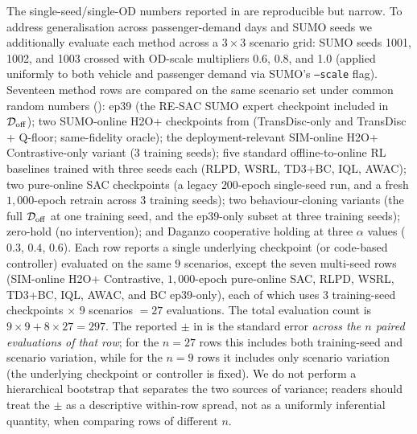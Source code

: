 The single-seed/single-OD numbers reported in  are reproducible but narrow.
To address generalisation across passenger-demand days and SUMO seeds we additionally
evaluate each method across a $3 \times 3$ scenario grid: SUMO seeds
1001, 1002, and 1003 crossed with OD-scale multipliers 0.6, 0.8, and 1.0
(applied uniformly to both vehicle and passenger demand via SUMO's
\texttt{--scale} flag).
Seventeen method rows are compared on the same scenario set under common random numbers ():
ep39 (the RE-SAC SUMO expert checkpoint included in $\mathcal{D}_{\mathrm{off}}$);
two SUMO-online H2O+ checkpoints from  (TransDisc-only and TransDisc + Q-floor; same-fidelity oracle);
the deployment-relevant SIM-online H2O+ Contrastive-only variant ($3$ training seeds);
five standard offline-to-online RL baselines trained with three seeds each (RLPD, WSRL, TD3+BC, IQL, AWAC);
two pure-online SAC checkpoints (a legacy $200$-epoch single-seed run, and a fresh $1{,}000$-epoch retrain across $3$ training seeds);
two behaviour-cloning variants (the full $\mathcal{D}_{\mathrm{off}}$ at one training seed, and the ep39-only subset at three training seeds);
zero-hold (no intervention);
and Daganzo cooperative holding at three $\alpha$ values ($0.3$, $0.4$, $0.6$).
Each row reports a single underlying checkpoint (or code-based controller) evaluated on the same $9$ scenarios, except the seven multi-seed rows (SIM-online H2O+ Contrastive, $1{,}000$-epoch pure-online SAC, RLPD, WSRL, TD3+BC, IQL, AWAC, and BC ep39-only), each of which uses $3$ training-seed checkpoints $\times$ $9$ scenarios $= 27$ evaluations.
The total evaluation count is $9 \times 9 + 8 \times 27 = 297$.
The reported $\pm$ in  is the standard error \emph{across the $n$ paired evaluations of that row}; for the $n=27$ rows this includes both training-seed and scenario variation, while for the $n=9$ rows it includes only scenario variation (the underlying checkpoint or controller is fixed). We do not perform a hierarchical bootstrap that separates the two sources of variance; readers should treat the $\pm$ as a descriptive within-row spread, not as a uniformly inferential quantity, when comparing rows of different $n$.

